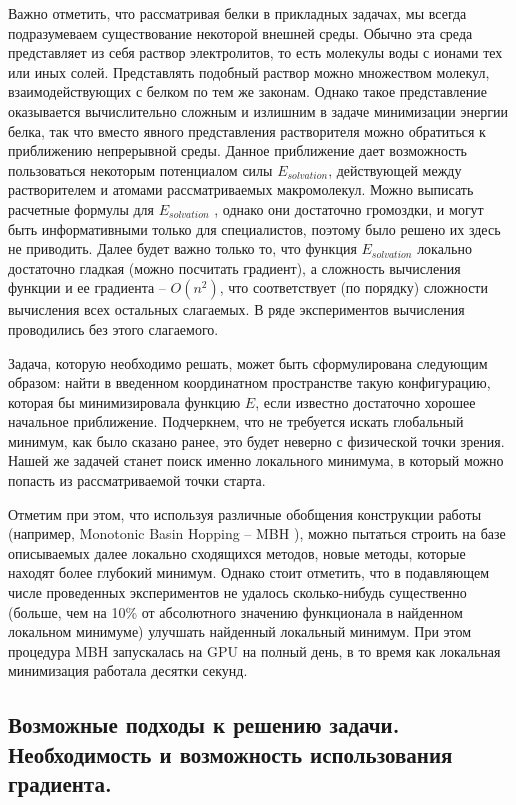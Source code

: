   Важно отметить, что рассматривая белки в прикладных задачах, мы всегда подразумеваем существование некоторой внешней среды.
  Обычно эта среда представляет из себя раствор электролитов, то есть молекулы воды с ионами тех или иных солей.
  Представлять подобный раствор можно множеством молекул, взаимодействующих с белком по тем же законам.
  Однако такое представление оказывается вычислительно сложным и излишним в задаче минимизации энергии белка, так что вместо явного представления растворителя можно обратиться к приближению непрерывной среды.
  Данное приближение дает возможность пользоваться некоторым потенциалом силы $E_{solvation}$, действующей между растворителем и атомами рассматриваемых макромолекул.
  Можно выписать расчетные формулы для $E_{solvation}$ \cite{still1990semianalytical}, однако они достаточно громоздки, и могут быть информативными только для специалистов, поэтому было решено их здесь не приводить.
  Далее будет важно только то, что функция $E_{solvation}$ локально достаточно гладкая (можно посчитать градиент), а сложность вычисления функции и ее градиента -- ${O}\left( n^2 \right)$, что соответствует (по порядку) сложности вычисления всех остальных слагаемых.
  В ряде экспериментов вычисления проводились без этого слагаемого.

  Задача, которую необходимо решать, может быть сформулирована следующим образом: найти в введенном координатном пространстве такую конфигурацию, которая бы минимизировала функцию $E$, если известно достаточно хорошее начальное приближение. Подчеркнем, что не требуется искать глобальный минимум, как было сказано ранее, это будет неверно с физической точки зрения.
  Нашей же задачей станет поиск именно локального минимума, в который можно попасть из рассматриваемой точки старта.

  Отметим при этом, что используя различные обобщения конструкции работы \cite{wales1997global} (например, Monotonic Basin Hopping -- MBH \cite{posypkin2010}), можно пытаться строить на базе описываемых далее локально сходящихся методов, новые методы, которые находят более глубокий минимум.
  Однако стоит отметить, что в подавляющем числе проведенных экспериментов не удалось сколько-нибудь существенно (больше, чем на 10\% от абсолютного значению функционала в найденном локальном минимуме) улучшать найденный локальный минимум.
  При этом процедура MBH запускалась на GPU на полный день, в то время как локальная минимизация работала десятки секунд.

  \subsection{Возможные подходы к решению задачи. Необходимость и возможность использования градиента.}\label{subsec:sec1/su3}

